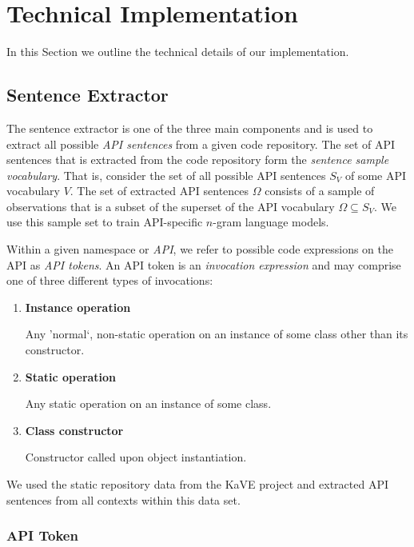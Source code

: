 \section{Technical Implementation}
\label{section-technicalimplementation}
In this Section we outline the technical details of our implementation.

\subsection{Sentence Extractor}
\label{section-sentenceextractor}
The sentence extractor is one of the three main components and is used to extract all possible \textit{API sentences} from a given code repository. The set of API sentences that is extracted from the code repository form the \textit{sentence sample vocabulary}. That is, consider the set of all possible API sentences $S_V$ of some API vocabulary $V$. The set of extracted API sentences $\Omega$ consists of a sample of observations that is a subset of the superset of the API vocabulary $\Omega \subseteq S_V$.
We use this sample set to train API-specific $n$-gram language models.

Within a given namespace or \textit{API}, we refer to possible code expressions on the API as \textit{API tokens}.
An API token is an \textit{invocation expression} and may comprise one of three different types of invocations:

\begin{enumerate}
	\item \textbf{Instance operation}
	
	Any 'normal`, non-static operation on an instance of some class other than its constructor.
	
	\item \textbf{Static operation}
	
	Any static operation on an instance of some class.

	\item \textbf{Class constructor}
	
	Constructor called upon object instantiation.
\end{enumerate}

We used the static repository data from the KaVE project \cite{Kave} and extracted API sentences from all contexts within this data set.

\subsubsection{API Token}
\label{section-apitoken}

